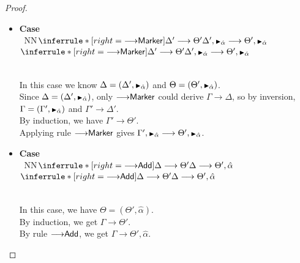 \documentclass[a4paper]{article}
\newcommand{\smallblacktriangle}{\text{\textscale{0.7}{$\blacktriangleright$}}}
\newcommand{\MonnierCommaSym}{{\smallblacktriangle}}
\newcommand{\MonnierComma}[1]{{\MonnierCommaSym}_{#1}}
\gdef\xxDerivationProofCaseColor{N}
\newcommand{\DerivationProofCase}[3]{\smallskip
     \item \parbox[t]{100ex}{\textbf{Case } \\[-0.5em]
       $~$\hspace{5ex}
       \if\xxDerivationProofCaseColor N\ensuremath{\Infer{#1}{#2}{#3}}
       \else \colorbox{\xxDerivationProofCaseColor}{\ensuremath{\Infer{#1}{#2}{#3}}}\fi }\nopagebreak \\[-0.8ex]
  }
\newcommand{\Infer}[3]{\inferrule*[right={\text{\strut#1}}]{{}#2\mathstrut}{{}#3\mathstrut}}
\newcommand{\extendssym}{\longrightarrow}
\newcommand{\extends}[2]{{#1} \extendssym {#2}}
\newcommand{\substextend}[2]{\extends{#1}{#2}}
\newcommand{\ahat}{\hat{\alpha}}
\newcommand{\rulename}[1]{\text{\normalfont\textsf{#1}}}
\newcommand{\substextendrulename}[1]{\ensuremath{{\extendssym}{\rulename{#1}}}\xspace}
\newcommand{\substextendMonMon}{\substextendrulename{Marker}}
\newcommand{\substextendSolve}{\substextendrulename{Solve}}
\newcommand{\substextendAdd}{\substextendrulename{Add}}
\newcommand{\substextendAddSolved}{\substextendrulename{AddSolved}}
\begin{document}
\begin{proof}
\begin{itemize}
\begin{itemize}
              \DerivationProofCase{\substextendAddSolved}
                                  {\substextend{\Gamma}{\Delta'}}
                                  {\substextend{\Gamma}{\Delta', \ahat=\tau_1}}

                    By induction, we have $\substextend{\Gamma}{\Theta'}$. \\
                    By rule \substextendAddSolved, we get $\substextend{\Gamma}{\Theta', \ahat=\tau_2}$. 

              \DerivationProofCase{\substextendSolve}
                                  {\substextend{\Gamma'}{\Delta'} }
                                  {\substextend{\Gamma', \ahat}{\Delta', \ahat=\tau_1}}

                    We have $\Gamma = (\Gamma', \ahat)$. \\
                    By induction, $\substextend{\Gamma'}{\Theta'}$. \\
                    By rule \substextendSolve, we get $\substextend{\Gamma', \ahat}{\Theta', \ahat=\tau_2}$.
          \end{itemize}
          
  \DerivationProofCase{\substextendMonMon}
                      {\substextend{\Delta'}{\Theta'}}
                      {\substextend{\Delta', \MonnierComma{\ahat}}{\Theta', \MonnierComma{\ahat}}}

      In this case we know $\Delta = (\Delta', \MonnierComma{\ahat})$ and $\Theta = (\Theta', \MonnierComma{\ahat})$. \\
      Since $\Delta = (\Delta', \MonnierComma{\ahat})$, only \substextendMonMon could derive
      $\substextend{\Gamma}{\Delta}$,
      so by inversion,
        $\Gamma = (\Gamma', \MonnierComma{\ahat})$
        and $\substextend{\Gamma'}{\Delta'}$. \\
      By induction, we have $\substextend{\Gamma'}{\Theta'}$. \\
      Applying rule \substextendMonMon gives 
      $\substextend{\Gamma', \MonnierComma{\ahat}}{\Theta', \MonnierComma{\ahat}}$. 

  \DerivationProofCase{\substextendAdd}
                      {\substextend{\Delta}{\Theta'}}
                      {\substextend{\Delta}{\Theta', \ahat}}

      In this case, we have $\Theta = (\Theta', \ahat)$. \\
      By induction, we get $\substextend{\Gamma}{\Theta'}$. \\
      By rule \substextendAdd, we get $\substextend{\Gamma}{\Theta', \ahat}$. 


\end{itemize}
\end{proof}
\end{document}
